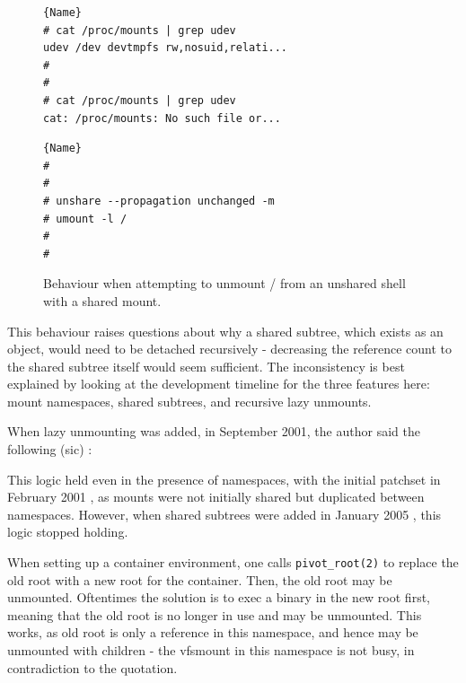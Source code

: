\documentclass[sigplan]{acmart}
\begin{document}
\begin{figure}
\begin{minipage}{.45\textwidth}

\begin{lstlisting}[frame=tlrb,showlines=true]{Name}
# cat /proc/mounts | grep udev
udev /dev devtmpfs rw,nosuid,relati...
#
#
# cat /proc/mounts | grep udev
cat: /proc/mounts: No such file or...
\end{lstlisting}
\end{minipage}\hfill
\begin{minipage}{.45\textwidth}

\begin{lstlisting}[frame=tlrb]{Name}
#
#
# unshare --propagation unchanged -m
# umount -l /
#
#
\end{lstlisting}

\end{minipage}

\caption{Behaviour when attempting to unmount / from an unshared shell with a shared mount.}
\label{fig:unshare-umount-lazy}
\end{figure}

This behaviour raises questions about why a shared subtree, which exists as an object, would need to be detached recursively - decreasing the reference count to the shared subtree itself would seem sufficient. The inconsistency is best explained by looking at the development timeline for the three features here: mount namespaces, shared subtrees, and recursive lazy unmounts.

When lazy unmounting was added, in September 2001, the author said the following (sic) \citep{viro_patch_2001}:


This logic held even in the presence of namespaces, with the initial patchset in February 2001 \citep{viro_patch_2001}, as mounts were not initially shared but duplicated between namespaces. However, when shared subtrees were added in January 2005 \citep{viro_rfc_2005}, this logic stopped holding.

When setting up a container environment, one calls \texttt{pivot\_root(2)} to replace the old root with a new root for the container. Then, the old root may be unmounted. Oftentimes the solution is to exec a binary in the new root first, meaning that the old root is no longer in use and may be unmounted. This works, as old root is only a reference in this namespace, and hence may be unmounted with children - the vfsmount in this namespace is not busy, in contradiction to the quotation.
\end{document}
